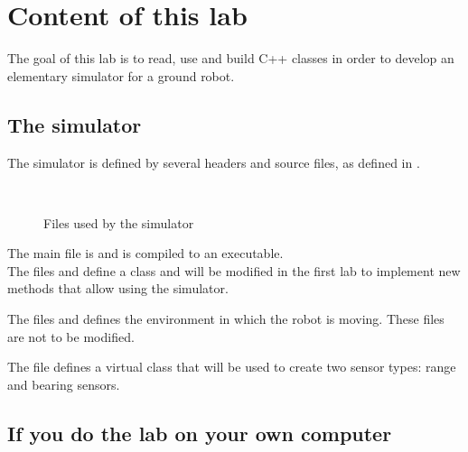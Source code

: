 \documentclass{ecnreport}
\begin{document}



\section{Content of this lab}

The goal of this lab is to read, use and build C++ classes in order to develop an elementary simulator for a ground robot.

\subsection{The simulator}

The simulator is defined by several headers and source files, as defined in .
\begin{figure}[h]
\begin{minipage}{.25\linewidth} ~ \end{minipage}
\begin{minipage}{.5\linewidth}
\end{minipage}
\caption{\label{fig:dirtree} Files used by the simulator}
\end{figure}

The main file is  and is compiled to an executable.\\
The files  and  define a  class and will be modified in the first lab to implement new methods that allow using the simulator.

The files  and  defines the environment in which the robot is moving. These files are not to be modified.

The file  defines a virtual class  that will be used to create two sensor types: range and bearing sensors.

\subsection{If you do the lab on your own computer}
\end{document}
